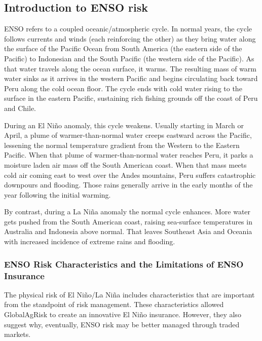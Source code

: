\documentclass[authoryear]{article}
\begin{document}
\subsection{Introduction to ENSO risk}
ENSO refers to a coupled oceanic/atmospheric cycle. In normal years, the cycle follows currents and winds (each reinforcing the other) as they bring water along the surface of the Pacific Ocean from South America (the eastern side of the Pacific) to Indonesian and the South Pacific (the western side of the Pacific). As that water travels along the ocean surface, it warms. The resulting mass of warm water sinks as it arrives in the western Pacific and begins circulating back toward Peru along the cold ocean floor. The cycle ends with cold water rising to the surface in the eastern Pacific, sustaining rich fishing grounds off the coast of Peru and Chile.

During an El Ni\~no anomaly, this cycle weakens. Usually starting in March or April, a plume of warmer-than-normal water creeps eastward across the Pacific, lessening the normal temperature gradient from the Western to the Eastern Pacific. When that plume of warmer-than-normal water reaches Peru, it parks a moisture laden air mass off the South American coast. When that mass meets cold air coming east to west over the Andes mountains, Peru suffers catastrophic downpours and flooding. Those rains generally arrive in the early months of the year following the initial warming.

By contrast, during a La Ni\~na anomaly the normal cycle enhances. More water gets pushed from the South American coast, raising sea-surface temperatures in Australia and Indonesia above normal. That leaves Southeast Asia and Oceania with increased incidence of extreme rains and flooding.

\subsubsection{ENSO Risk Characteristics and the Limitations of ENSO Insurance}
The physical risk of El Ni\~no/La Ni\~na includes characteristics that are important from the standpoint of risk management. These characteristics allowed GlobalAgRisk to create an innovative El Ni\~no insurance. However, they also suggest why, eventually, ENSO risk may be better managed through traded markets. 
\end{document}
